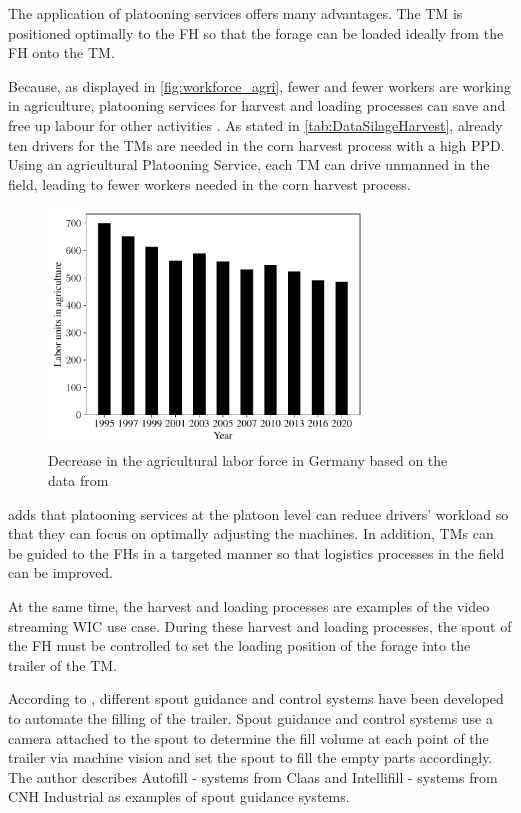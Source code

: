 The application of platooning services offers many advantages.
The \ac{TM} is positioned optimally to the \ac{FH} so that the forage can be loaded ideally from the \ac{FH} onto the \ac{TM}.

Because, as displayed in \autoref{fig:workforce_agri}, fewer and fewer workers are working in agriculture, platooning services for harvest and loading processes can save and free up labour for other activities \cite{liu_automation_2022}. As stated in \autoref{tab:DataSilageHarvest}, already ten drivers for the \ac{TM}s are needed in the corn harvest process with a high \ac{PPD}. Using an agricultural Platooning Service, each \ac{TM} can drive unmanned in the field, leading to fewer workers needed in the corn harvest process.

\begin{figure}[H]
	\centering
	\includegraphics[width=0.75\textwidth]{figures/WorkForceAgriculture.pdf}
	\caption{Decrease in the agricultural labor force in Germany based on the data from \cite{bmel2020}}%
	\label{fig:workforce_agri}%
\end{figure}

\textcite{smolnik_5g_2020} adds that platooning services at the platoon level can reduce drivers' workload so that they can focus on optimally adjusting the machines.
In addition, \ac{TM}s can be guided to the \ac{FH}s in a targeted manner so that logistics processes in the field can be improved.

At the same time, the harvest and loading processes are examples of the video streaming \ac{WIC} use case. During these harvest and loading processes, the spout of the \ac{FH} must be controlled to set the loading position of the forage into the trailer of the \ac{TM}.

According to \textcite{murcia_quadrotor_2014}, different spout guidance and control systems have been developed to automate the filling of the trailer. Spout guidance and control systems use a camera attached to the spout to determine the fill volume at each point of the trailer via machine vision and set the spout to fill the empty parts accordingly. The author describes Autofill - systems from Claas and Intellifill - systems from CNH Industrial as examples of spout guidance systems. 

